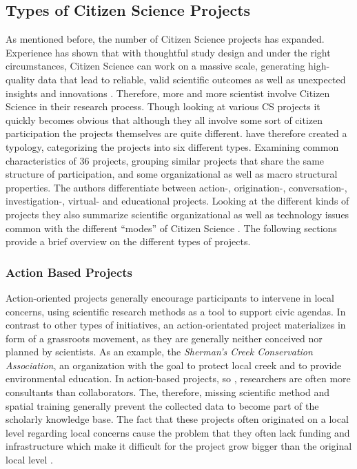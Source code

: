 \subsection{Types of Citizen Science Projects}
\label{ssec:Types_CS}
As mentioned before, the number of Citizen Science projects has expanded. Experience has shown that with thoughtful study design and under the right circumstances, Citizen Science can work on a massive scale, generating high-quality data that lead to reliable, valid scientific outcomes as well as unexpected insights and innovations  \parencite{Hakalay2014}. Therefore, more and more scientist involve Citizen Science in their research process. Though looking at various CS projects it quickly becomes  obvious that although they all involve some sort of citizen participation the projects themselves are quite different. \citeauthor{WigginsCrowston2011} have therefore created a typology, categorizing the projects into six different types. Examining common characteristics of 36 projects, grouping similar projects that share the same structure of participation, and some organizational as well as macro structural properties. The authors differentiate between action-, origination-, conversation-, investigation-, virtual- and educational projects. Looking at the different kinds of projects they also summarize scientific organizational as well as technology issues common with the different “modes” of Citizen Science \parencite{WigginsCrowston2011}. The following sections provide a brief overview on the different types of projects. 

\subsubsection{Action Based Projects}
Action-oriented projects generally encourage participants to intervene in local concerns, using scientific research methods as a tool to support civic agendas. In contrast to other types of initiatives, an action-orientated project materializes in form of a grassroots movement, as they are generally neither conceived nor planned by scientists. As an example, the \textit{Sherman’s Creek Conservation Association}, an organization with the goal to protect local creek and to provide environmental education. In action-based projects, so \citeauthor{WigginsCrowston2011}, researchers are often more consultants than collaborators. The, therefore, missing scientific method and spatial training generally prevent the collected data to become part of the scholarly knowledge base. The fact that these projects often originated on a local level regarding local concerns cause the problem that they often lack funding and infrastructure which make it difficult for the project grow bigger than the original local level \parencite{WigginsCrowston2011}.

